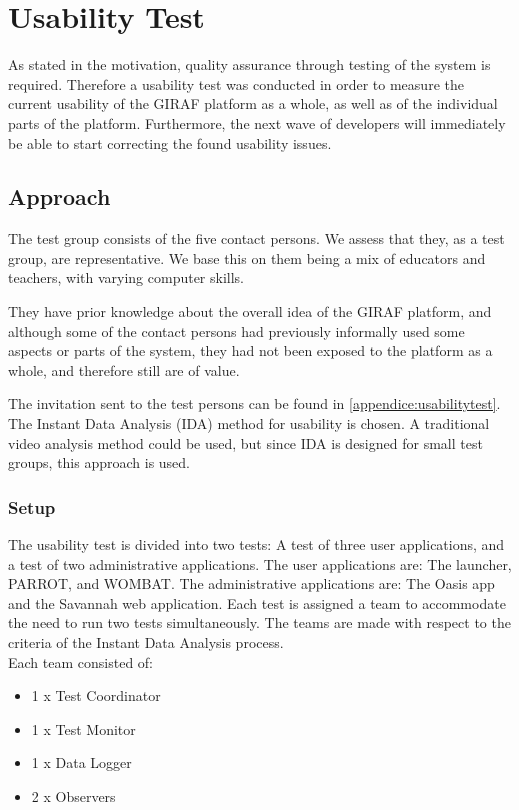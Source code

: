 \section{Usability Test}
\label{common:sec:usabilitytest}
As stated in the motivation, quality assurance through testing of the system is required. Therefore a usability test was conducted in order to measure the current usability of the GIRAF platform as a whole, as well as of the individual parts of the platform. Furthermore, the next wave of developers will immediately be able to start correcting the found usability issues.

\subsection{Approach}
The test group consists of the five contact persons. We assess that they, as a test group, are representative. We base this on them being a mix of educators and teachers, with varying computer skills.

They have prior knowledge about the overall idea of the GIRAF platform, and although some of the contact persons had previously informally used some aspects or parts of the system, they had not been exposed to the platform as a whole, and therefore still are of value.

The invitation sent to the test persons can be found in \autoref{appendice:usabilitytest}.\\

The Instant Data Analysis (IDA) method for usability is chosen. A traditional video analysis method could be used, but since IDA is designed for small test groups, this approach is used. \cite{usability:ida}

\subsubsection*{Setup}
The usability test is divided into two tests: A test of three user applications, and a test of two administrative applications. 
The user applications are: The launcher, PARROT, and WOMBAT. The administrative applications are: The Oasis app and the Savannah web application.
Each test is assigned a team to accommodate the need to run two tests simultaneously.
The teams are made with respect to the criteria of the Instant Data Analysis process.\\
Each team consisted of:

\begin{itemize}
	\item 1 x Test Coordinator
	\item 1 x Test Monitor
	\item 1 x Data Logger
	\item 2 x Observers
\end{itemize}

